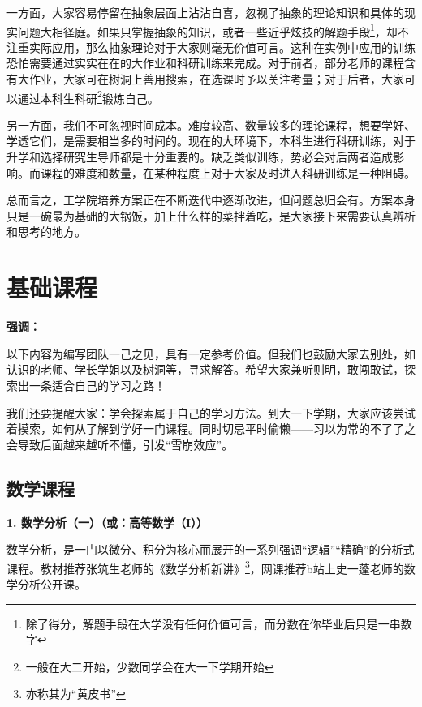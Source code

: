 \documentclass[11pt,oneside]{book}
\begin{document}
\vspace{10pt}

一方面，大家容易停留在抽象层面上沾沾自喜，忽视了抽象的理论知识和具体的现实问题大相径庭。如果只掌握抽象的知识，或者一些近乎炫技的解题手段\footnote{除了得分，解题手段在大学没有任何价值可言，而分数在你毕业后只是一串数字}，却不注重实际应用，那么抽象理论对于大家则毫无价值可言。这种在实例中应用的训练恐怕需要通过实实在在的大作业和科研训练来完成。对于前者，部分老师的课程含有大作业，大家可在树洞上善用搜索，在选课时予以关注考量；对于后者，大家可以通过本科生科研\footnote{一般在大二开始，少数同学会在大一下学期开始}锻炼自己。

\vspace{10pt}

另一方面，我们不可忽视时间成本。难度较高、数量较多的理论课程，想要学好、学透它们，是需要相当多的时间的。现在的大环境下，本科生进行科研训练，对于升学和选择研究生导师都是十分重要的。缺乏类似训练，势必会对后两者造成影响。而课程的难度和数量，在某种程度上对于大家及时进入科研训练是一种阻碍。

\vspace{10pt}

总而言之，工学院培养方案正在不断迭代中逐渐改进，但问题总归会有。方案本身只是一碗最为基础的大锅饭，加上什么样的菜拌着吃，是大家接下来需要认真辨析和思考的地方。

\section{基础课程}
\textbf{强调：}

以下内容为编写团队一己之见，具有一定参考价值。但我们也鼓励大家去别处，如认识的老师、学长学姐以及树洞等，寻求解答。希望大家兼听则明，敢闯敢试，探索出一条适合自己的学习之路！

\vspace{10pt}

我们还要提醒大家：学会探索属于自己的学习方法。到大一下学期，大家应该尝试着摸索，如何从了解到学好一门课程。同时切忌平时偷懒——习以为常的不了了之会导致后面越来越听不懂，引发“雪崩效应”。

\subsection{数学课程}
\textbf{1. 数学分析（一）（或：高等数学（I））}

数学分析，是一门以微分、积分为核心而展开的一系列强调“逻辑”“精确”的分析式课程。教材推荐张筑生老师的《数学分析新讲》\footnote{亦称其为“黄皮书”}，网课推荐b站上史一蓬老师的数学分析公开课。
\end{document}
